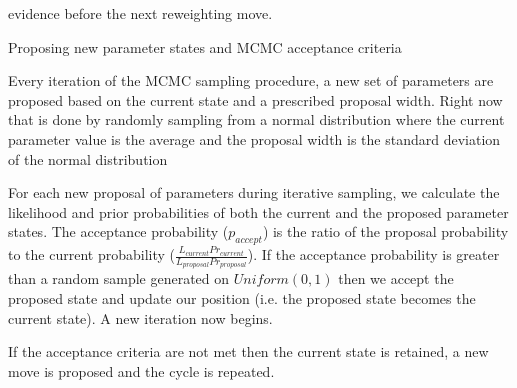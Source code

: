 \documentclass{report}
\begin{document}
\begin{outline}
\begin{outline}
\begin{outline}
\begin{outline}
\begin{outline}
{                evidence before the next reweighting move.}
      \end{outline}
      \item{Proposing new parameter states and MCMC acceptance criteria}
      \begin{outline}
        \item{Every iteration of the MCMC sampling procedure, a new set of parameters are proposed based on the current state and a prescribed proposal width.
              Right now that is done by randomly sampling from a normal distribution where the current parameter value is the average and the proposal width is
              the standard deviation of the normal distribution}
        \item{For each new proposal of parameters during iterative sampling, we calculate the likelihood and prior probabilities of both the current and the proposed parameter
              states. The acceptance probability ($p_{accept}$) is the ratio of the proposal probability to the current probability ($\frac{L_{current}
              Pr_{current}}{L_{proposal} Pr_{proposal}}$). If the acceptance probability is greater than a random sample generated on $Uniform\left(0,1\right)$
              then we accept the proposed state and update our position (i.e. the proposed state becomes the current state). A new iteration now begins.
        \item{If the acceptance criteria are not met then the current state is retained, a new move is proposed  and the cycle is repeated.}
}
\end{outline}
\end{outline}
\end{outline}
\end{outline}
\end{outline}
\end{document}
